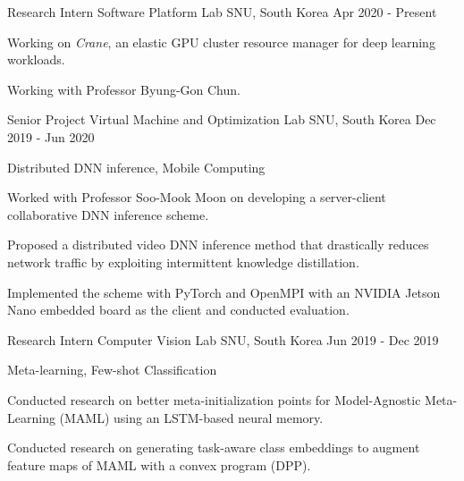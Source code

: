 

\begin{cventries}

  \cventry
    {Research Intern} %
    {Software Platform Lab} %
    {SNU, South Korea} %
    {Apr 2020 - Present} %
    {
      \begin{cvitems} %
        \item {Working on \textit{Crane}, an elastic GPU cluster resource manager for deep learning workloads.}
        \item {Working with Professor Byung-Gon Chun.}
      \end{cvitems}
    }
    
  \cventry
    {Senior Project} %
    {Virtual Machine and Optimization Lab} %
    {SNU, South Korea} %
    {Dec 2019 - Jun 2020} %
    {
      \begin{cvitems} %
        \item {Distributed DNN inference, Mobile Computing}
        \item {Worked with Professor Soo-Mook Moon on developing a server-client collaborative DNN inference scheme.}
        \item {Proposed a distributed video DNN inference method that drastically reduces network traffic by exploiting intermittent knowledge distillation.}
        \item {Implemented the scheme with PyTorch and OpenMPI with an NVIDIA Jetson Nano embedded board as the client and conducted evaluation.}
      \end{cvitems}
    }
    
  \cventry
    {Research Intern} %
    {Computer Vision Lab} %
    {SNU, South Korea} %
    {Jun 2019 - Dec 2019} %
    {
      \begin{cvitems} %
        \item {Meta-learning, Few-shot Classification}
        \item {Conducted research on better meta-initialization points for Model-Agnostic Meta-Learning (MAML) using an LSTM-based neural memory.}
        \item {Conducted research on generating task-aware class embeddings to augment feature maps of MAML with a convex program (DPP).}
      \end{cvitems}
    }
    

\end{cventries}
